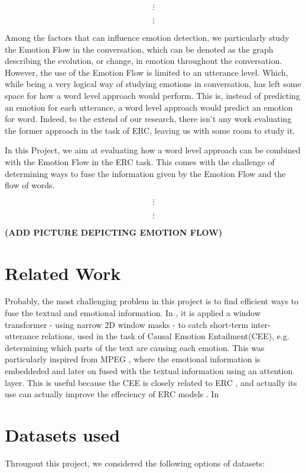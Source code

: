 \documentclass[oneside, a4paper, onecolumn, 11pt]{article}
\begin{document}
$$\vdots$$

$$\vdots$$

Among the factors that can influence emotion detection, we particularly study the Emotion Flow in the conversation, which can be
denoted as the graph describing the evolution, or change, in emotion throughout the conversation. However, the use of the Emotion 
Flow is limited to an utterance level. Which, while being a very logical way of studying emotions in conversation, has left some 
space for how a word level approach would perform. This is, instead of predicting an emotion for each utterance, a word level approach 
would predict an emotion for word. Indeed, to the extend of our research, there isn't any work evaluating the former approach in the 
task of ERC, leaving us with some room to study it.

In this Project, we aim at evaluating how a word level approach can be combined with the Emotion Flow in the ERC task. This comes with 
the challenge of determining ways to fuse the information given by the Emotion Flow and the flow of words. 

$$\vdots$$

$$\vdots$$

\textbf{(ADD PICTURE DEPICTING EMOTION FLOW)}

\section{Related Work} 
Probably, the most challenging problem in this project is to find efficient ways to fuse the textual and emotional information. 
In \cite{LIU2025126924}, it is applied a window transformer - using narrow 2D window masks - to catch short-term inter-utterance relations, 
used in the task of Causal Emotion Entailment(CEE), e.g. determining which parts of the text are causing each emotion. This was 
particularly inspired from MPEG \cite{10252019}, where the emotional information is embeddeded and later on fused with the textual 
information using an attention layer. This is useful because the CEE is closely related to ERC , and actually its use can actually 
improve the effeciency of ERC models \cite{LIU2025126924}. In 



\section{Datasets used}

Througout this project, we considered the following options of datasets:
\end{document}
